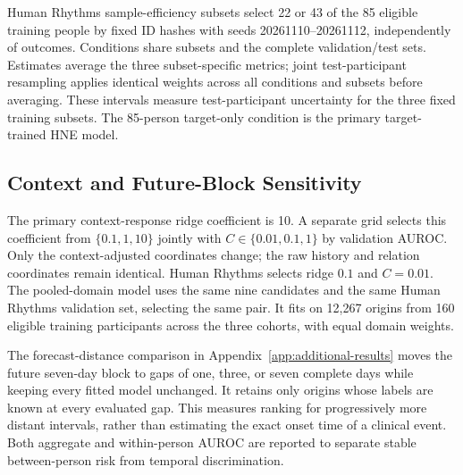 Human Rhythms sample-efficiency subsets select 22 or 43 of the 85 eligible training people by fixed ID hashes with seeds 20261110--20261112, independently of outcomes. Conditions share subsets and the complete validation/test sets. Estimates average the three subset-specific metrics; joint test-participant resampling applies identical weights across all conditions and subsets before averaging. These intervals measure test-participant uncertainty for the three fixed training subsets. The 85-person target-only condition is the primary target-trained HNE model.

\subsection{Context and Future-Block Sensitivity}
The primary context-response ridge coefficient is 10. A separate grid selects this coefficient from $\{0.1,1,10\}$ jointly with $C\in\{0.01,0.1,1\}$ by validation AUROC. Only the context-adjusted coordinates change; the raw history and relation coordinates remain identical. Human Rhythms selects ridge $0.1$ and $C=0.01$. The pooled-domain model uses the same nine candidates and the same Human Rhythms validation set, selecting the same pair. It fits on 12,267 origins from 160 eligible training participants across the three cohorts, with equal domain weights.

The forecast-distance comparison in Appendix~\ref{app:additional-results} moves the future seven-day block to gaps of one, three, or seven complete days while keeping every fitted model unchanged. It retains only origins whose labels are known at every evaluated gap. This measures ranking for progressively more distant intervals, rather than estimating the exact onset time of a clinical event. Both aggregate and within-person AUROC are reported to separate stable between-person risk from temporal discrimination.


